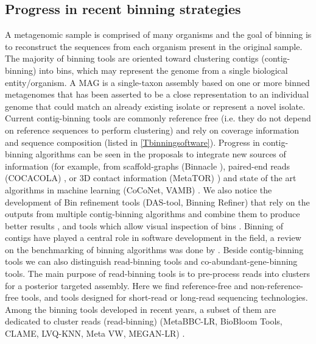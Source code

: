 \documentclass{article}
\begin{document}
\subsection{Progress in recent binning strategies}
A metagenomic sample is comprised of many organisms and the goal of binning is to reconstruct the sequences from each organism present in the original sample.
The majority of binning tools are oriented toward clustering contigs (contig-binning) into bins, which may represent the genome from a single biological entity/organism.
A \gls{MAG} is a single-taxon assembly based on one or more binned metagenomes that has been asserted to be a close representation to an individual genome that could match an already existing isolate or represent a novel isolate.
Current contig-binning tools are commonly reference free (i.e. they do not depend on reference sequences to perform clustering) and rely on coverage information and sequence composition (listed in \autoref{Tbinningsoftware}).
Progress in contig-binning algorithms can be seen in the proposals to integrate new sources of information (for example, from scaffold-graphs (Binnacle \cite{Muralidharah2021binnacle}), paired-end reads (COCACOLA) \cite{Lu2016COCACOLA}, or 3D contact information (MetaTOR) \cite{Baudry2019Metator}) and state of the art algorithms in machine learning (CoCoNet, VAMB) \cite{nissenimproved, arisdakessian2021coconet}.
We also notice the development of Bin refinement tools (DAS-tool, Binning Refiner) that rely on the outputs from multiple contig-binning algorithms and combine them to produce better results \cite{Song2017Binningrefiner, sieber2018recovery}, and tools which allow visual inspection of bins \cite{Broeksema2017IcoVer, Laczny2017BusyBee}.
Binning of contigs have played a central role in software development in the field, a review on the benchmarking of binning algorithms was done by . 
Beside contig-binning tools we can also distinguish read-binning tools and co-abundant-gene-binning tools.
The main purpose of read-binning tools is to pre-process reads into clusters for a posterior targeted assembly.
Here we find reference-free and non-reference-free tools, and tools designed for short-read or long-read sequencing technologies.
Among the binning tools developed in recent years, a subset of them are dedicated to cluster reads (read-binning) (MetaBBC-LR, BioBloom Tools, CLAME, LVQ-KNN, Meta VW, MEGAN-LR) \cite{wickramarachchi2020metabcc, chu2014biobloom, benavides2018clame, belka2018lvq, vervier2016large, huson2018megan}.
\end{document}
